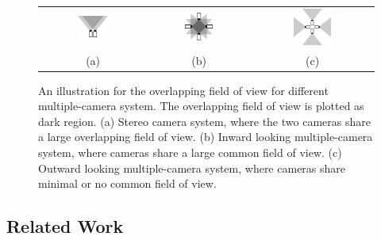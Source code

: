 \documentclass{report}
\begin{document}
\setlength{\tabcolsep}{4pt}
\begin{figure}
\centering
\begin{tabular}{ccc}
\includegraphics[width=0.3\textwidth]{images/stereofov.eps}&
\includegraphics[width=0.3\textwidth]{images/inwardfov.eps}&
\includegraphics[width=0.33\textwidth]{images/outwardfov.eps}\\
(a) & (b) & (c)
\end{tabular}
\caption{An illustration for the overlapping field of view for different multiple-camera system. The overlapping field of view is plotted as dark region. (a) Stereo camera system, where the two cameras share a large overlapping field of view. (b) Inward looking multiple-camera system, where cameras share a large common field of view. (c) Outward looking multiple-camera system, where cameras share minimal or no common field of view. }
\label{fovFig}
\end{figure}


\subsection{Related Work}
\end{document}
